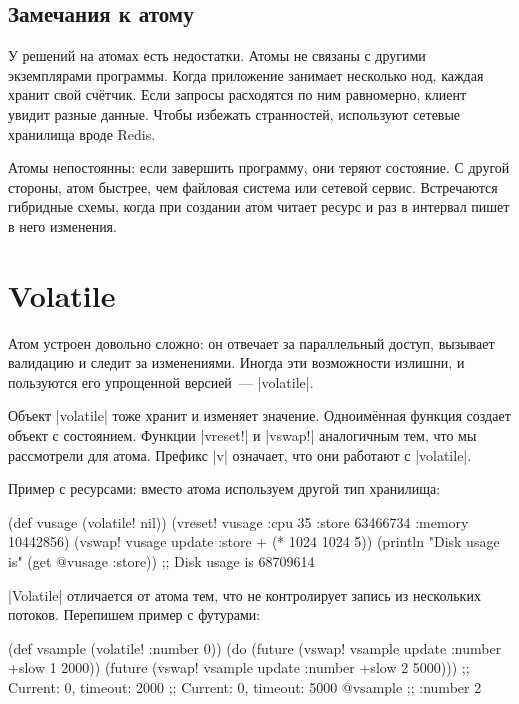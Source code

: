 \subsection{Замечания к атому}

У решений на атомах есть недостатки. Атомы не связаны с другими экземплярами
программы. Когда приложение занимает несколько нод, каждая хранит свой
сч\"{е}тчик. Если запросы расходятся по ним равномерно, клиент увидит разные
данные. Чтобы избежать странностей, используют сетевые хранилища вроде Redis.

Атомы непостоянны: если завершить программу, они теряют состояние. С другой
стороны, атом быстрее, чем файловая система или сетевой сервис. Встречаются
гибридные схемы, когда при создании атом читает ресурс и раз в интервал пишет в
него изменения.

\section{Volatile}

Атом устроен довольно сложно: он отвечает за параллельный доступ, вызывает
валидацию и следит за изменениями. Иногда эти возможности излишни, и пользуются
его упрощенной версией~--- \spverb|volatile|.

Объект \spverb|volatile| тоже хранит и изменяет значение. Одноим\"{е}нная функция
создает объект с состоянием. Функции \spverb|vreset!| и \spverb|vswap!|
аналогичным тем, что мы рассмотрели для атома. Префикс \spverb|v| означает, что
они работают с \spverb|volatile|.

Пример с ресурсами: вместо атома используем другой тип хранилища:

\begin{english}
  \begin{clojure}
(def vusage (volatile! nil))
(vreset! vusage
         {:cpu 35
          :store 63466734
          :memory 10442856})
(vswap! vusage update :store + (* 1024 1024 5))
(println "Disk usage is" (get @vusage :store))
;; Disk usage is 68709614
  \end{clojure}
\end{english}

\spverb|Volatile| отличается от атома тем, что не контролирует запись из
нескольких потоков. Перепишем пример с футурами:

\begin{english}
  \begin{clojure}
(def vsample (volatile! {:number 0}))
(do (future (vswap! vsample update :number +slow 1 2000))
    (future (vswap! vsample update :number +slow 2 5000)))
;; Current: 0, timeout: 2000
;; Current: 0, timeout: 5000
@vsample ;; {:number 2}
  \end{clojure}
\end{english}

